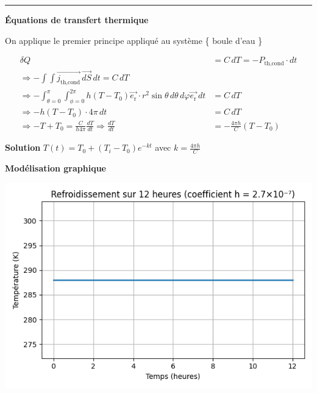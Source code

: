 \documentclass[a4paper,12pt]{article}
\begin{document}
    
\begin{center}
  
\end{center}
\noindent\textcolor{gray}{\rule{\linewidth}{0.4pt}}


\textbf{Équations de transfert thermique}

On applique le premier principe appliqué au système \{ boule d'eau  \}

\begin{align*}
\delta Q &= C\, dT = -P_{\text{th,cond}} \cdot dt \\
\Rightarrow -\int \int \vec{j_{\text{th,cond}}}\, \vec{dS}\,dt = C\, dT \\
\Rightarrow -\int_{\theta=0}^\pi \int_{\phi=0}^{2\pi} h(T - T_0) \vec{e_{\text{r}}}\cdot r^2 \sin\theta\, d\theta\, d\varphi \vec{e_{\text{r}}}\, dt &=  C\, dT  \\
\Rightarrow -h(T - T_0) \cdot 4\pi\, dt &= C\, dT \\
\Rightarrow -T + T_0 = \frac{C}{h 4\pi} \frac{dT}{dt} \Rightarrow \frac{dT}{dt} &= -\frac{4\pi h}{C}(T - T_0)
\end{align*}

\vspace{0.5cm}

\textbf{Solution} 
$T(t) = T_0 + (T_i - T_0)e^{-kt}$ \quad avec $k = \frac{4\pi h}{C}$
\\
\bigskip

\textbf{Modélisation graphique}
\begin{center}
  \includegraphics[width=0.8\linewidth]{../modele2/figures/modele2.png}
\end{center}
    
\end{document}
